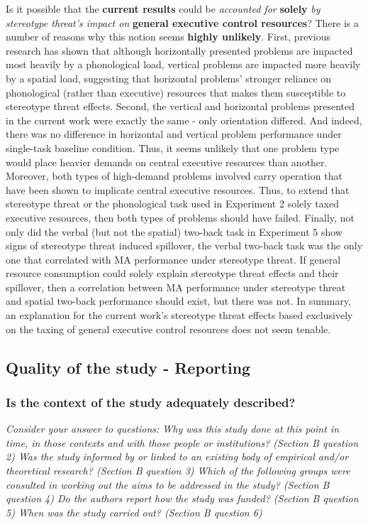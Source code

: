 \documentclass[
  doc, a4paper]{apa7}
\begin{document}
Is it possible that the \textbf{current results} could be \emph{accounted for} \textbf{solely} \emph{by stereotype threat's impact on} \textbf{general executive control resources}? There is a number of reasons why this notion seems \textbf{highly unlikely}. First, previous research has shown that although horizontally presented problems are impacted most heavily by a phonological load, vertical problems are impacted more heavily by a spatial load, suggesting that horizontal problems' stronger reliance on phonological (rather than executive) resources that makes them susceptible to stereotype threat effects. Second, the vertical and horizontal problems presented in the current work were exactly the same - only orientation differed. And indeed, there was no difference in horizontal and vertical problem performance under single-task baseline condition. Thus, it seems unlikely that one problem type would place heavier demands on central executive resources than another. Moreover, both types of high-demand problems involved carry operation that have been shown to implicate central executive resources. Thus, to extend that stereotype threat or the phonological task used in Experiment 2 solely taxed executive resources, then both types of problems should have failed. Finally, not only did the verbal (but not the spatial) two-back task in Experiment 5 show signs of stereotype threat induced spillover, the verbal two-back task was the only one that correlated with MA performance under stereotype threat. If general resource consumption could solely explain stereotype threat effects and their spillover, then a correlation between MA performance under stereotype threat and spatial two-back performance should exist, but there was not. In summary, an explanation for the current work's stereotype threat effects based exclusively on the taxing of general executive control resources does not seem tenable.

\subsection{Quality of the study - Reporting}\label{quality-of-the-study---reporting}

\subsubsection{Is the context of the study adequately described?}\label{is-the-context-of-the-study-adequately-described}

\emph{Consider your answer to questions: Why was this study done at this point in time, in those contexts and with those people or institutions? (Section B question 2) Was the study informed by or linked to an existing body of empirical and/or theoretical research? (Section B question 3) Which of the following groups were consulted in working out the aims to be addressed in the study? (Section B question 4) Do the authors report how the study was funded? (Section B question 5) When was the study carried out? (Section B question 6)}
\end{document}

